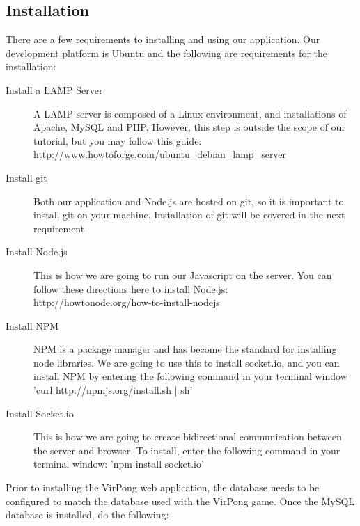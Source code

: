 	\subsection{Installation}
		There are a few requirements to installing and using our application. Our development platform is Ubuntu and the following are requirements for the installation:
		\begin{description}
			\item[Install a LAMP Server] A LAMP server is composed of a Linux environment, and installations of Apache, MySQL and PHP. However, this step is outside the scope of our tutorial, but you may follow this guide:\\ 
		http://www.howtoforge.com/ubuntu\_debian\_lamp\_server
			\item[Install git] Both our application and Node.js are hosted on git, so it is important to install git on your machine. Installation of git will be covered in the next requirement
			\item[Install Node.js] This is how we are going to run our Javascript on the server. You can follow these directions here to install Node.js:\\http://howtonode.org/how-to-install-nodejs
			\item[Install NPM] NPM is a package manager and has become the standard for installing node libraries. We are going to use this to install socket.io, and you can install NPM by entering the following command in your terminal window 'curl http://npmjs.org/install.sh | sh'
			\item[Install Socket.io] This is how we are going to create bidirectional communication between the server and browser. To install, enter the following command in your terminal window: 'npm install socket.io'
		\end{description}
		Prior to installing the VirPong web application, the database needs to be configured to match the database used with the VirPong game. Once the MySQL database is installed, do the following:
